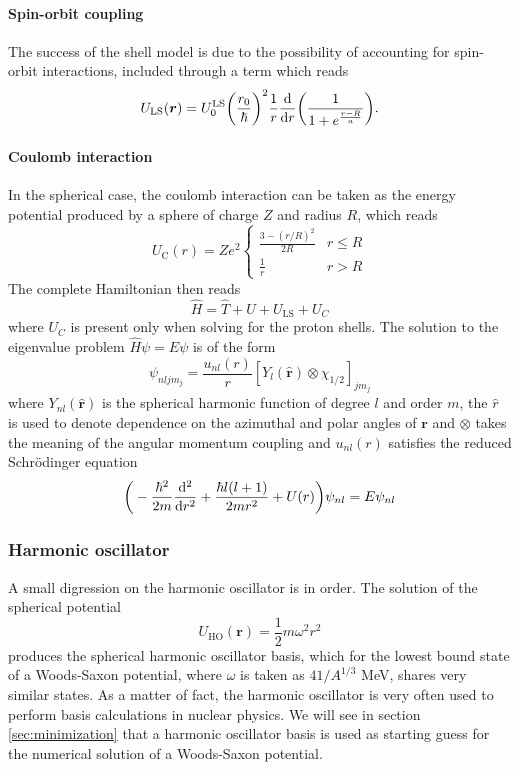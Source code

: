 \paragraph{Spin-orbit coupling} 
The success of the shell model is due to the possibility of accounting for spin-orbit interactions, included through a term which reads
\begin{equation}
    U_{\text{LS}}(\bm r )=U_0^{\text{LS}}\bigg(\frac{r_0}{\hbar}\bigg)^2 \frac 1 r \dv{}{r}\bigg (\frac{1}{1+e^{\frac{r-R}{a}}}\bigg).
\end{equation}
\paragraph{Coulomb interaction}
In the spherical case, the coulomb interaction can be taken as the energy potential produced by a sphere of charge $Z$ and radius $R$, which reads
\begin{equation}
    U_{\text{C}}(r) = Ze^2
    \begin{cases}
        \frac{3-(r/R)^2}{2R} & r \le R \\
        \frac 1 r & r > R
    \end{cases}
\end{equation}
The complete Hamiltonian then reads
\begin{equation}
    \hat H = \hat T + U + U_{\text{LS}}+U_C
\end{equation}
where $U_C$ is present only when solving for the proton shells. The solution to the eigenvalue problem $\hat H \psi = E\psi$ is of the form
\begin{equation}
   \psi_{nljm_j} = \frac{u_{nl}(r)}{r}[Y_{l}(\hat {\bm r})\otimes \chi_{1/2}]_{jm_j} 
\end{equation}
where $Y_{nl}(\hat {\bm r})$ is the spherical harmonic function of degree $l$ and order $m$, the $\hat r$ is used to denote dependence on the azimuthal and polar angles of $\bm r$ and $\otimes$ takes the meaning of the angular momentum coupling and $u_{nl}(r)$ satisfies the reduced Schr\"odinger equation
\begin{equation}
    \label{eq:red}
    \bigg(-\frac {\hbar^2}{2m}\dv[2]{r}+\frac{\hbar l(l+1)}{2mr^2}+U(r)\bigg)\psi_{nl} = E\psi_{nl}
\end{equation}
\subsubsection{Harmonic oscillator}
A small digression on the harmonic oscillator is in order. The solution of the spherical potential 
\begin{equation}
U_{\text{HO}} (\bm r ) = \frac 1 2 m\omega^2 r^ 2
\end{equation}
produces the spherical harmonic oscillator basis, which for the lowest bound state of a Woods-Saxon potential, where $\omega$ is taken as $41/A^{1/3}$ MeV, shares very similar states. As a matter of fact, the harmonic oscillator is very often used to perform basis calculations in nuclear physics. We will see in section \ref{sec:minimization} that a harmonic oscillator basis is used as starting guess for the numerical solution of a Woods-Saxon potential.
